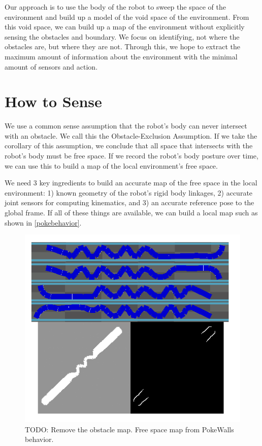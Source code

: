 Our approach is to use the body of the robot to sweep the space of the environment and build up a model of the void space of the environment. From this void space, we can build up a map of the environment without explicitly sensing the obstacles and boundary. We focus on identifying, not where the obstacles are, but where they are not. Through this, we hope to extract the maximum amount of information about the environment with the minimal amount of sensors and action.

\section{How to Sense}
\label{howtosense}

We use a common sense assumption that the robot's body can never intersect with an obstacle. We call this the Obstacle-Exclusion Assumption. If we take the corollary of this assumption, we conclude that all space that intersects with the robot's body must be free space. If we record the robot's body posture over time, we can use this to build a map of the local environment's free space.

We need 3 key ingredients to build an accurate map of the free space in the local environment: 1) known geometry of the robot's rigid body linkages, 2) accurate joint sensors for computing kinematics, and 3) an accurate reference pose to the global frame. If all of these things are available, we can build a local map such as shown in \autoref{pokebehavior}.

\begin{figure}[htbp]
\centering
\includegraphics[keepaspectratio,width=400pt,height=0.75\textheight]{PokeBehavior.png}
\caption{TODO: Remove the obstacle map. Free space map from PokeWalls behavior.}
\label{pokebehavior}
\end{figure}



